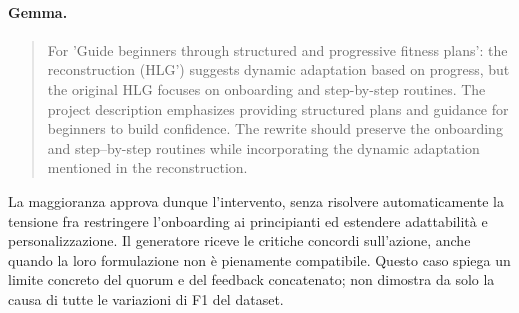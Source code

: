 \paragraph{Gemma.}
\begin{quote}\small
For 'Guide beginners through structured and progressive fitness plans': the reconstruction (HLG') suggests dynamic adaptation based on progress, but the original HLG focuses on onboarding and step-by-step routines. The project description emphasizes providing structured plans and guidance for beginners to build confidence. The rewrite should preserve the onboarding and step--by-step routines while incorporating the dynamic adaptation mentioned in the reconstruction.
\end{quote}
La maggioranza approva dunque l'intervento, senza risolvere automaticamente
la tensione fra restringere l'onboarding ai principianti ed estendere
adattabilit\`a e personalizzazione. Il generatore riceve le critiche concordi
sull'azione, anche quando la loro formulazione non \`e pienamente compatibile.
Questo caso spiega un limite concreto del quorum e del feedback concatenato;
non dimostra da solo la causa di tutte le variazioni di F1 del dataset.

